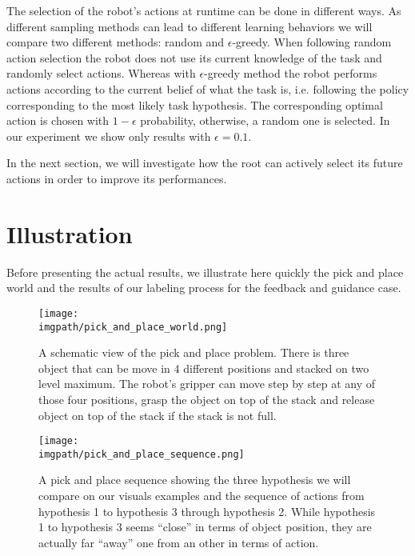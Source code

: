 The selection of the robot's actions at runtime can be done in different ways. As different sampling methods can lead to different learning behaviors we will compare two different methods: random and  $\epsilon$-greedy. When following random action selection the robot does not use its current knowledge of the task and randomly select actions. Whereas with $\epsilon$-greedy method the robot performs actions according to the current belief of what the task is, i.e. following the policy corresponding to the most likely task hypothesis. The corresponding optimal action is chosen with $1-\epsilon$ probability, otherwise, a random one is selected. In our experiment we show only results with $\epsilon =  0.1$.

In the next section, we will investigate how the root can actively select its future actions in order to improve its performances.

\section{Illustration}

Before presenting the actual results, we illustrate here quickly the pick and place world and the results of our labeling process for the feedback and guidance case.

\begin{figure}[!ht]
  \centering
  \texttt{[image: \\imgpath/pick\_and\_place\_world.png]}
  \caption{A schematic view of the pick and place problem. There is three object that can be move in 4 different positions and stacked on two level maximum. The robot's gripper can move step by step at any of those four positions, grasp the object on top of the stack and release object on top of the stack if the stack is not full.}
  \label{fig:lfui:pickplaceworld}
\end{figure}


\begin{figure}[!ht]
  \centering
  \texttt{[image: \\imgpath/pick\_and\_place\_sequence.png]}
  \caption{A pick and place sequence showing the three hypothesis we will compare on our visuals examples and the sequence of actions from hypothesis 1 to hypothesis 3 through hypothesis 2. While hypothesis 1 to hypothesis 3 seems ``close'' in terms of object position, they are actually far ``away'' one from an other in terms of action.}
  \label{fig:lfui:pickplacesequence}
\end{figure}


